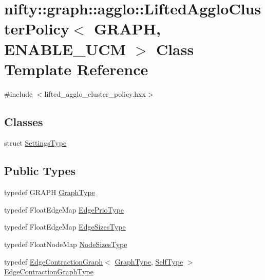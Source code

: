 \hypertarget{classnifty_1_1graph_1_1agglo_1_1LiftedAggloClusterPolicy}{}\section{nifty\+:\+:graph\+:\+:agglo\+:\+:Lifted\+Agglo\+Cluster\+Policy$<$ G\+R\+A\+PH, E\+N\+A\+B\+L\+E\+\_\+\+U\+CM $>$ Class Template Reference}
\label{classnifty_1_1graph_1_1agglo_1_1LiftedAggloClusterPolicy}


{\ttfamily \#include $<$lifted\+\_\+agglo\+\_\+cluster\+\_\+policy.\+hxx$>$}

\subsection*{Classes}
\begin{DoxyCompactItemize}
\item 
struct \hyperlink{structnifty_1_1graph_1_1agglo_1_1LiftedAggloClusterPolicy_1_1SettingsType}{Settings\+Type}
\end{DoxyCompactItemize}
\subsection*{Public Types}
\begin{DoxyCompactItemize}
\item 
typedef G\+R\+A\+PH \hyperlink{classnifty_1_1graph_1_1agglo_1_1LiftedAggloClusterPolicy_a727d681b2fa133b8c9b225ab11cd2402}{Graph\+Type}
\item 
typedef Float\+Edge\+Map \hyperlink{classnifty_1_1graph_1_1agglo_1_1LiftedAggloClusterPolicy_a0a1035fa94e97e15913aee18d446da78}{Edge\+Prio\+Type}
\item 
typedef Float\+Edge\+Map \hyperlink{classnifty_1_1graph_1_1agglo_1_1LiftedAggloClusterPolicy_a910399705bc9a60aabb360ac4e9c21d8}{Edge\+Sizes\+Type}
\item 
typedef Float\+Node\+Map \hyperlink{classnifty_1_1graph_1_1agglo_1_1LiftedAggloClusterPolicy_a2d0fff8850777c3e10a61b3cdb963207}{Node\+Sizes\+Type}
\item 
typedef \hyperlink{classnifty_1_1graph_1_1EdgeContractionGraph}{Edge\+Contraction\+Graph}$<$ \hyperlink{classnifty_1_1graph_1_1agglo_1_1LiftedAggloClusterPolicy_a727d681b2fa133b8c9b225ab11cd2402}{Graph\+Type}, \hyperlink{classnifty_1_1graph_1_1agglo_1_1LiftedAggloClusterPolicy}{Self\+Type} $>$ \hyperlink{classnifty_1_1graph_1_1agglo_1_1LiftedAggloClusterPolicy_a2fb57e57cf31de0f2d446cfd17d263a7}{Edge\+Contraction\+Graph\+Type}
\end{DoxyCompactItemize}
